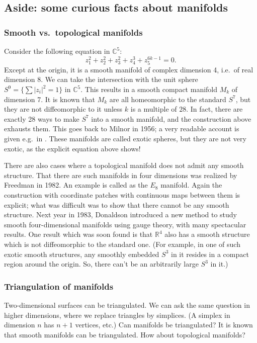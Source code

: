 \documentclass[12pt]{article}
\numberwithin{equation}{section}
\numberwithin{figure}{section}
\theoremstyle{remark}
\def\bC{\mathbb{C}}
\def\bR{\mathbb{R}}
\begin{document}
\subsection{Aside: some curious facts about manifolds}
\label{sec:smooth-vs-topological}

\subsubsection{Smooth vs.~topological manifolds}
Consider the following equation in $\bC^5$:
\begin{equation}
z_1^2+z_2^2+z_3^2+z_4^3+z_5^{6k-1}=0.  
\end{equation} Except at the origin, it is a smooth manifold of complex dimension 4, 
i.e.~of real dimension 8.
We can take the intersection with the unit sphere $S^9=\{\sum|z_i|^2=1\}$ in $\bC^5$.
This results in a smooth compact manifold $M_k$ of dimension 7.
It is known that $M_k$ are all homeomorphic to the standard $S^7$,
but they are not diffeomorphic to it unless $k$ is a multiple of $28$.
In fact, there are exactly 28 ways to make $S^7$ into a smooth manifold,
and the construction above exhausts them.
This goes back to Milnor in 1956; a very readable account is given e.g.~in \cite{MeerThesis}.
These manifolds are called exotic spheres, 
but they are not very exotic, as the explicit equation above shows!

There are also cases where a topological manifold does not admit any smooth structure.
That there are such manifolds in four dimensions was realized by Freedman \cite{Freedman} in 1982.
An example is called as the $E_8$ manifold.
Again the construction with coordinate patches with continuous maps between them is explicit;
what was difficult was to show that there cannot be any smooth structure. 
Next year in 1983, Donaldson \cite{Donaldson} 
introduced a new method to study smooth four-dimensional manifolds
using gauge theory, with many spectacular results.
One result which was soon found is that $\bR^4$ also has a smooth structure 
which is not diffeomorphic to the standard one.
(For example, in one of such exotic smooth structures, 
any smoothly embedded $S^3$ in it resides in a compact region around the origin.
So, there can't be an arbitrarily large $S^3$ in it.)

\subsubsection{Triangulation of manifolds}
Two-dimensional surfaces can be triangulated. 
We can ask the same question in higher dimensions,
where we replace triangles by simplices. (A simplex in dimension $n$ has $n+1$ vertices, etc.)
Can manifolds be triangulated?
It is known that smooth manifolds can be triangulated. 
How about topological manifolds?
\end{document}
